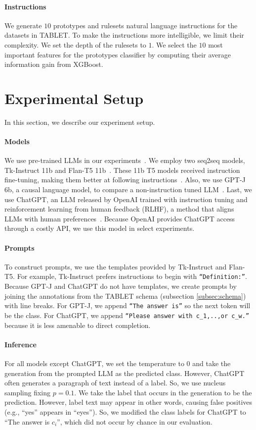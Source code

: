 \paragraph{Instructions} We generate $10$ prototypes and rulesets natural language instructions for the datasets in TABLET. To make the instructions more intelligible, we limit their complexity. We set the depth of the rulesets to $1$. We select the $10$ most important features for the prototypes classifier by computing their average information gain from XGBoost.

\label{sec:experiments}

\section{Experimental Setup} In this section, we describe our experiment setup.

\paragraph{Models} We use pre-trained LLMs in our experiments~\cite{NEURIPS2020_1457c0d6}. We employ two seq2seq models, Tk-Instruct 11b and Flan-T5 11b~\cite{supernaturalinstructions, flant5}. These 11b T5 models received instruction fine-tuning, making them better at following instructions~\cite{2020t5}. Also, we use GPT-J 6b, a causal language model, to compare a non-instruction tuned LLM~\cite{gpt-j}. Last, we use ChatGPT, an LLM released by OpenAI trained with instruction tuning and reinforcement learning from human feedback (RLHF), a method that aligns LLMs with human preferences~\cite {chatgpt}. Because OpenAI provides ChatGPT access through a costly API, we use this model in select experiments.

\paragraph{Prompts}
To construct prompts, we use the templates provided by Tk-Instruct and Flan-T5. For example, Tk-Instruct prefers instructions to begin with \texttt{``Definition:''}.
Because GPT-J and ChatGPT do not have templates, we create prompts by joining the annotations from the TABLET schema (subsection \ref{subsec:schema}) with line breaks. For GPT-J, we append \texttt{``The answer is''} so the next token will be the class. For ChatGPT, we append \texttt{``Please answer with $c_1$,..,or $c_w$.''} because it is less amenable to direct completion.

\paragraph{Inference} For all models except ChatGPT, we set the temperature to 0 and take the generation from the prompted LLM as the predicted class. However, ChatGPT often generates a paragraph of text instead of a label. So, we use nucleus sampling fixing $p=0.1$. We take the label that occurs in the generation to be the prediction. However, label text may appear in other words, causing false positives (e.g., ``yes'' appears in ``eyes''). So, we modified the class labels for ChatGPT to ``The answer is \texttt{$c_i$}'', which did not occur by chance in our evaluation.


